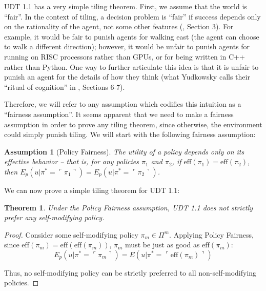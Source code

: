 \documentclass{article}
\newcommand{\qq}[1]{\ulcorner #1 \urcorner}
\newtheorem{assumption}{Assumption}
\newtheorem{theorem}{Theorem}
\begin{document}
UDT 1.1 has a very simple tiling theorem. First, we assume that the world is ``fair''. In the context of tiling, a decision problem is ``fair'' if success depends only on the rationality of the agent, not some other features (\cite{yudkowsky2010timeless}, Section 3). For example, it would be fair to punish agents for walking east (the agent can choose to walk a different direction); however, it would be unfair to punish agents for running on RISC processors rather than GPUs, or for being written in C++ rather than Python. One way to further articulate this idea is that it is unfair to punish an agent for the details of how they think (what Yudkowsky calls their ``ritual of cognition'' in \cite{yudkowsky2010timeless}, Sections 6-7). 

Therefore, we will refer to any assumption which codifies this intuition as a ``fairness assumption''. It seems apparent that we need to make a fairness assumption in order to prove any tiling theorem, since otherwise, the environment could simply punish tiling. We will start with the following fairness assumption:

\begin{assumption}[Policy Fairness]
The utility of a policy depends only on its effective behavior -- that is, for any policies $\pi_1$ and $\pi_2$, if $\text{eff}(\pi_1) = \text{eff}(\pi_2)$, then $E_p(u|\pi^*=\qq{\pi_1}) = E_p(u|\pi^*=\qq{\pi_2})$.
\end{assumption}

We can now prove a simple tiling theorem for UDT 1.1:

\begin{theorem}
Under the Policy Fairness assumption, UDT 1.1 does not strictly prefer any self-modifying policy.
\end{theorem}
\begin{proof}

Consider some self-modifying policy $\pi_m \in \Pi^m$. Applying Policy Fairness, since $\text{eff}(\pi_m) = \text{eff}(\text{eff}(\pi_m))$, $\pi_m$ must be just as good as $\text{eff}(\pi_m)$: $$E_p(u|\pi^*=\qq{\pi_m}) = E(u|\pi^*=\qq{\text{eff}(\pi_m)})$$

Thus, no self-modifying policy can be strictly preferred to all non-self-modifying policies.

\end{proof}
\end{document}
